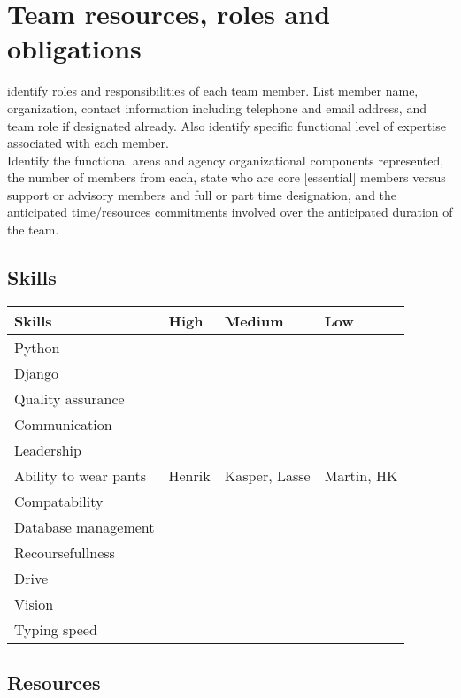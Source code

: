 \section{Team resources, roles and obligations}
identify roles and responsibilities of each team member. List member name, organization, contact
information including telephone and email address, and team role if designated already. Also identify
specific functional level of expertise associated with each member.\\
Identify the functional areas and agency organizational components represented, the number of members
from each, state who are core [essential] members versus support or advisory members and full or part time
designation, and the anticipated time/resources commitments involved over the anticipated duration of the
team.

\subsection{Skills}
\begin{table}
    \centering
    \begin{tabular}{l|l|l|l}
        \rowcolor{Gray}
        \textbf{Skills} & \textbf{High} & \textbf{Medium} & \textbf{Low}\\\hline
         Python & & &\\
         Django & & &\\
         Quality assurance & & &\\
         Communication & & &\\
         Leadership & & &\\
         Ability to wear pants & Henrik & Kasper, Lasse & Martin, HK\\
         Compatability & & &\\
         Database management & & &\\
         Recoursefullness & & &\\
         Drive & & &\\
         Vision & & &\\
         Typing speed & & &\\
    \end{tabular}
    \label{tab:Skillz}
\end{table}

\subsection{Resources}

